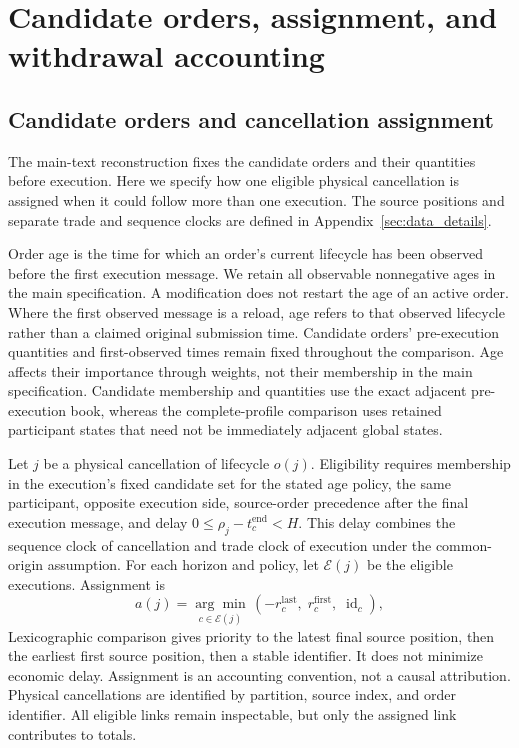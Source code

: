 \section{Candidate orders, assignment, and withdrawal accounting}
\label{sec:withdrawal_technical}
\subsection{Candidate orders and cancellation assignment}
\label{subsec:canonical_matched_withdrawal}
The main-text reconstruction fixes the candidate orders and their quantities before execution. Here we specify how one eligible physical cancellation is assigned when it could follow more than one execution. The source positions and separate trade and sequence clocks are defined in Appendix~\ref{sec:data_details}.

Order age is the time for which an order's current lifecycle has been observed before the first execution message. We retain all observable nonnegative ages in the main specification. A modification does not restart the age of an active order. Where the first observed message is a reload, age refers to that observed lifecycle rather than a claimed original submission time. Candidate orders' pre-execution quantities and first-observed times remain fixed throughout the comparison. Age affects their importance through weights, not their membership in the main specification. Candidate membership and quantities use the exact adjacent pre-execution book, whereas the complete-profile comparison uses retained participant states that need not be immediately adjacent global states.

Let $j$ be a physical cancellation of lifecycle $o(j)$. Eligibility requires membership in the execution's fixed candidate set for the stated age policy, the same participant, opposite execution side, source-order precedence after the final execution message, and delay $0\leq\rho_j-t_c^{\mathrm{end}}<H$. This delay combines the sequence clock of cancellation and trade clock of execution under the common-origin assumption. For each horizon and policy, let $\mathcal E(j)$ be the eligible executions. Assignment is
\begin{equation}
    a(j)=\underset{c\in\mathcal E(j)}{\arg\min}\,
    \left(-r_c^{\mathrm{last}},\;r_c^{\mathrm{first}},\;\operatorname{id}_c\right),
    \label{eq:canonical_cancel_assignment}
\end{equation}
Lexicographic comparison gives priority to the latest final source position, then the earliest first source position, then a stable identifier. It does not minimize economic delay. Assignment is an accounting convention, not a causal attribution. Physical cancellations are identified by partition, source index, and order identifier. All eligible links remain inspectable, but only the assigned link contributes to totals.

